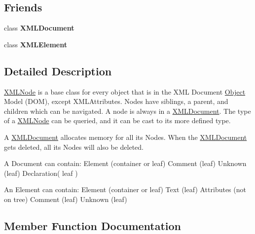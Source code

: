 \subsection*{Friends}
\begin{DoxyCompactItemize}
\item 
class {\bfseries X\+M\+L\+Document}\hypertarget{classtinyxml2_1_1_x_m_l_node_a4eee3bda60c60a30e4e8cd4ea91c4c6e}{}\label{classtinyxml2_1_1_x_m_l_node_a4eee3bda60c60a30e4e8cd4ea91c4c6e}

\item 
class {\bfseries X\+M\+L\+Element}\hypertarget{classtinyxml2_1_1_x_m_l_node_ac2fba9b6e452829dd892f7392c24e0eb}{}\label{classtinyxml2_1_1_x_m_l_node_ac2fba9b6e452829dd892f7392c24e0eb}

\end{DoxyCompactItemize}


\subsection{Detailed Description}
\hyperlink{classtinyxml2_1_1_x_m_l_node}{X\+M\+L\+Node} is a base class for every object that is in the X\+ML Document \hyperlink{class_object}{Object} Model (D\+OM), except X\+M\+L\+Attributes. Nodes have siblings, a parent, and children which can be navigated. A node is always in a \hyperlink{classtinyxml2_1_1_x_m_l_document}{X\+M\+L\+Document}. The type of a \hyperlink{classtinyxml2_1_1_x_m_l_node}{X\+M\+L\+Node} can be queried, and it can be cast to its more defined type.

A \hyperlink{classtinyxml2_1_1_x_m_l_document}{X\+M\+L\+Document} allocates memory for all its Nodes. When the \hyperlink{classtinyxml2_1_1_x_m_l_document}{X\+M\+L\+Document} gets deleted, all its Nodes will also be deleted.

\begin{DoxyVerb}A Document can contain: Element (container or leaf)
                        Comment (leaf)
                        Unknown (leaf)
                        Declaration( leaf )

An Element can contain: Element (container or leaf)
                        Text    (leaf)
                        Attributes (not on tree)
                        Comment (leaf)
                        Unknown (leaf)\end{DoxyVerb}
 

\subsection{Member Function Documentation}

